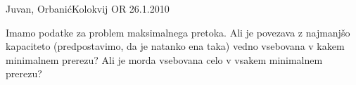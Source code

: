 \begin{naloga}{Juvan, Orbanić}{Kolokvij OR 26.1.2010}
\begin{vprasanje}
Imamo podatke za problem maksimalnega pretoka.
Ali je povezava z najmanjšo kapaciteto
(predpostavimo, da je natanko ena taka)
vedno vsebovana v kakem minimalnem prerezu?
Ali je morda vsebovana celo v vsakem minimalnem prerezu?
\end{vprasanje}
\begin{odgovor}
\end{odgovor}
\end{naloga}
